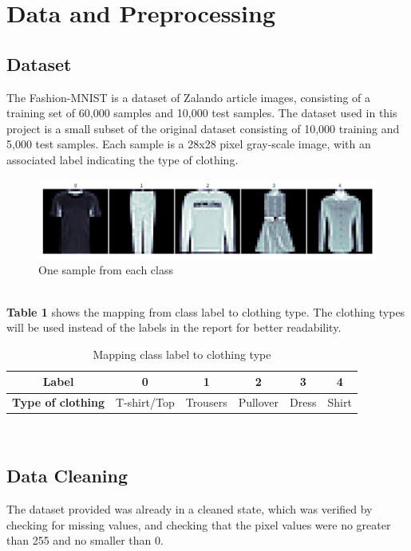 \section{Data and Preprocessing}
\subsection{Dataset}
The Fashion-MNIST is a dataset of Zalando article images, consisting of a training set of 60,000 samples and 10,000 test samples.
The dataset used in this project is a small subset of the original dataset consisting of 10,000 training and 5,000 test samples.
Each sample is a 28x28 pixel gray-scale image, with an associated label indicating the type of clothing.
\newline

\begin{figure}[ht]
\centering
\includegraphics[scale=0.45]{figures_for_report/samples_from_classes}
\captionsetup{justification=centering,margin=2cm}
\caption{One sample from each class}
\end{figure}\\

\textbf{Table 1} shows the mapping from class label to clothing type.
The clothing types will be used instead of the labels in the report for better readability. \\
\begin{table}[H]
  \footnotesize
  \centering
\begin{tabular}{ c c c c c c }
 \toprule
 \textbf{Label} & 0 & 1 & 2 & 3 & 4 \\
 \midrule 
 \textbf{Type of clothing} & T-shirt/Top & Trousers & Pullover & Dress & Shirt \\
 \bottomrule
\end{tabular} \\[0.2cm]
\captionsetup{justification=centering,margin=2cm}
\caption{Mapping class label to clothing type}
\label{tab:features}
\end{table}


\subsection{Data Cleaning}\label{subsec:data-cleaning}
The dataset provided was already in a cleaned state, which was verified by checking for missing values,
and checking that the pixel values were no greater than 255 and no smaller than 0.


